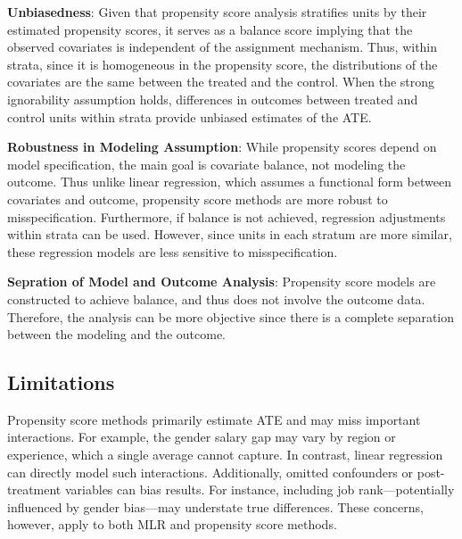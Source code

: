 \documentclass[12pt]{article}
\begin{document}

\textbf{Unbiasedness}: Given that propensity score analysis stratifies units by their estimated propensity scores, it serves as a balance score implying that the observed covariates is independent of the assignment mechanism. Thus, within strata, since it is homogeneous in the propensity score, the distributions of the covariates are the same between the treated and the control. When the strong ignorability assumption holds, differences in outcomes between treated and control units within strata provide unbiased estimates of the ATE.


\textbf{Robustness in Modeling Assumption}: While propensity scores depend on model specification, the main goal is covariate balance, not modeling the outcome. Thus unlike linear regression, which assumes a functional form between covariates and outcome, propensity score methods are more robust to misspecification. Furthermore, if balance is not achieved, regression adjustments within strata can be used. However, since units in each stratum are more similar, these regression models are less sensitive to misspecification.



\textbf{Sepration of Model and Outcome Analysis}: Propensity score models are constructed to achieve balance, and thus does not involve the outcome data. Therefore, the analysis can be more objective since there is a complete separation between the modeling and the outcome.

\subsection{Limitations} \label{subsec:limitations}

Propensity score methods primarily estimate ATE and may miss important interactions. For example, the gender salary gap may vary by region or experience, which a single average cannot capture. In contrast, linear regression can directly model such interactions. Additionally, omitted confounders or post-treatment variables can bias results. For instance, including job rank—potentially influenced by gender bias—may understate true differences. These concerns, however, apply to both MLR and propensity score methods.
\end{document}
